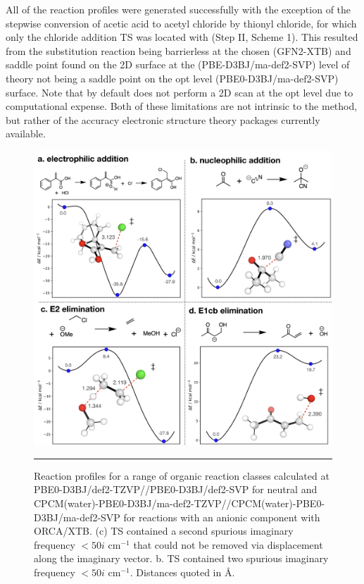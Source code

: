 \documentclass[../../main.tex]{subfiles}
\begin{document}
All of the reaction profiles were generated successfully with the exception of the stepwise conversion of acetic acid to acetyl chloride by thionyl chloride, for which only the chloride addition TS was located with \ade (Step II, Scheme 1). This resulted from the substitution reaction being barrierless at the chosen \lmethodx (GFN2-XTB) and saddle point found on the 2D surface at the  (PBE-D3BJ/ma-def2-SVP) level of theory not being a saddle point on the opt level (PBE0-D3BJ/ma-def2-SVP) surface. Note that \ade by default does not perform a 2D scan at the opt level due to computational expense. Both of these limitations are not intrinsic to the method, but rather of the accuracy electronic structure theory packages currently available.



\begin{figure}[h!]
	\vspace{0.4cm}
	\centering
	\includegraphics[width=\textwidth]{5/autode/figs/figS18a-d}
	\vspace{0.2cm}
	\hrule
	\caption{Reaction profiles for a range of organic reaction classes calculated at PBE0-D3BJ/def2-TZVP//PBE0-D3BJ/def2-SVP for neutral and CPCM(water)-PBE0-D3BJ/ma-def2-TZVP//CPCM(water)-PBE0-D3BJ/ma-def2-SVP for reactions with an anionic component with ORCA/XTB. (c) TS contained a second spurious imaginary frequency $< 50i \text{ cm}^{-1}$ that could not be removed via displacement along the imaginary vector. b. TS contained two spurious imaginary frequency $< 50i \text{ cm}^{-1}$. Distances quoted in \AA.}
	\label{fig::ade_si_18a}
\end{figure}
\end{document}
